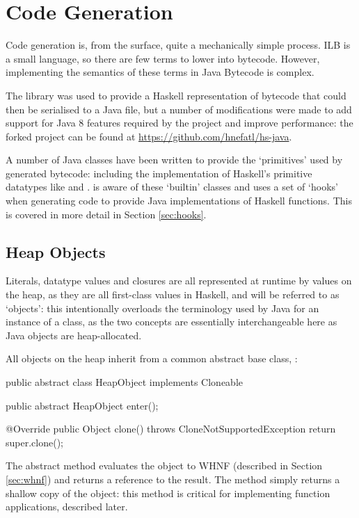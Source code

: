 \documentclass[dissertation.tex]{subfiles}
\begin{document}
\section{Code Generation}
{
    Code generation is, from the surface, quite a mechanically simple process. ILB is a small language, so there are few terms to lower into bytecode. However, implementing the semantics of these terms in Java Bytecode is complex.

    The  library was used to provide a Haskell representation of bytecode that could then be serialised to a Java  file, but a number of modifications were made to add support for Java 8 features required by the project and improve performance: the forked project can be found at \url{https://github.com/hnefatl/hs-java}.

    A number of Java classes have been written to provide the `primitives' used by generated bytecode: including the implementation of Haskell's primitive datatypes like  and . \compilername is aware of these `builtin' classes and uses a set of `hooks' when generating code to provide Java implementations of Haskell functions. This is covered in more detail in Section \ref{sec:hooks}.

    \subsection{Heap Objects}\label{sec:heap-objects}
    {
        Literals, datatype values and closures are all represented at runtime by values on the heap, as they are all first-class values in Haskell, and will be referred to as `objects': this intentionally overloads the terminology used by Java for an instance of a class, as the two concepts are essentially interchangeable here as Java objects are heap-allocated.

        All objects on the heap inherit from a common abstract base class, :

        \begin{javafigure}
        public abstract class HeapObject implements Cloneable {
            public abstract HeapObject enter();

            @Override
            public Object clone() throws CloneNotSupportedException {
                return super.clone();
            }
        }
        \end{javafigure}

        The abstract  method evaluates the object to WHNF (described in Section \ref{sec:whnf}) and returns a reference to the result. The  method simply returns a shallow copy of the object: this method is critical for implementing function applications, described later.

}}
\end{document}
